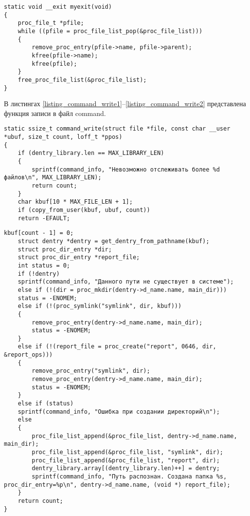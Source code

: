 \begin{center}
\begin{lstlisting}[label=listing_exit,caption=Функция выгрузки модуля]
static void __exit myexit(void)
{
	proc_file_t *pfile;
	while ((pfile = proc_file_list_pop(&proc_file_list)))
	{ 
		remove_proc_entry(pfile->name, pfile->parent);
		kfree(pfile->name);
		kfree(pfile);
	}
	free_proc_file_list(&proc_file_list);
}
	\end{lstlisting}
\end{center}

В листингах \ref{listing_command_write1}--\ref{listing_command_write2} представлена функция записи в файл command.

\begin{center}
	\begin{lstlisting}[label=listing_command_write1,caption=Функция записи в файл command]
static ssize_t command_write(struct file *file, const char __user *ubuf, size_t count, loff_t *ppos) 
{
	if (dentry_library.len == MAX_LIBRARY_LEN)
	{
		sprintf(command_info, "Невозможно отслеживать более %d файлов\n", MAX_LIBRARY_LEN);
		return count;
	}
	char kbuf[10 * MAX_FILE_LEN + 1];
	if (copy_from_user(kbuf, ubuf, count))
	return -EFAULT;
	\end{lstlisting}
\end{center}

\begin{center}
	\begin{lstlisting}[label=listing_command_write2,caption=Функция записи в файл command]
	kbuf[count - 1] = 0;
	struct dentry *dentry = get_dentry_from_pathname(kbuf);
	struct proc_dir_entry *dir;
	struct proc_dir_entry *report_file;
	int status = 0;
	if (!dentry)
	sprintf(command_info, "Данного пути не существует в системе");
	else if (!(dir = proc_mkdir(dentry->d_name.name, main_dir)))
	status = -ENOMEM;
	else if (!(proc_symlink("symlink", dir, kbuf)))
	{
		remove_proc_entry(dentry->d_name.name, main_dir);
		status = -ENOMEM;
	}
	else if (!(report_file = proc_create("report", 0646, dir, &report_ops)))
	{
		remove_proc_entry("symlink", dir);
		remove_proc_entry(dentry->d_name.name, main_dir);
		status = -ENOMEM;
	}
	else if (status)
	sprintf(command_info, "Ошибка при создании директорий\n");
	else
	{
		proc_file_list_append(&proc_file_list, dentry->d_name.name, main_dir);
		proc_file_list_append(&proc_file_list, "symlink", dir);
		proc_file_list_append(&proc_file_list, "report", dir);
		dentry_library.array[(dentry_library.len)++] = dentry;
		sprintf(command_info, "Путь распознан. Создана папка %s, proc_dir_entry=%p\n", dentry->d_name.name, (void *) report_file);
	}
	return count;
}
	\end{lstlisting}
\end{center}

